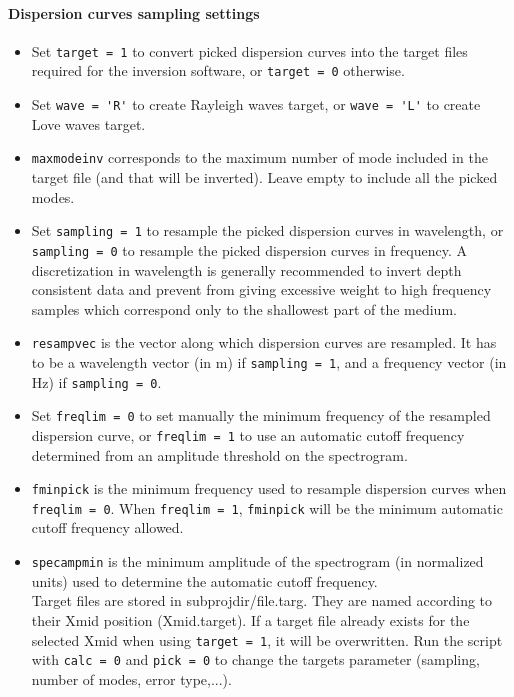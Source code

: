\documentclass[twoside,a4paper]{article}
\begin{document}
\paragraph{Dispersion curves sampling settings}
\begin{itemize}
\setlength\itemsep{2ex}
\setlength{\parindent}{5ex}

\item Set \verb|target = 1| to convert picked dispersion curves into the target files required for the inversion software, or \verb|target = 0| otherwise.

\item Set \verb|wave = 'R'| to create Rayleigh waves target, or \verb|wave = 'L'| to create Love waves target.

\item \verb|maxmodeinv| corresponds to the maximum number of mode included in the target file (and that will be inverted). Leave empty to include all the picked modes.

\item Set \verb|sampling = 1| to resample the picked dispersion curves in wavelength, or \verb|sampling = 0| to resample the picked dispersion curves in frequency. A discretization in wavelength is generally recommended to invert depth consistent data and prevent from giving excessive weight to high frequency samples which correspond only to the shallowest part of the medium.

\item \verb|resampvec| is the vector along which dispersion curves are resampled. It has to be a wavelength vector (in m) if \verb|sampling = 1|, and a frequency vector (in Hz) if \verb|sampling = 0|.

\item Set \verb|freqlim = 0| to set manually the minimum frequency of the resampled dispersion curve, or \verb|freqlim = 1| to use an automatic cutoff frequency determined from an amplitude threshold on the spectrogram.

\item \verb|fminpick| is the minimum frequency used to resample dispersion curves when \verb|freqlim = 0|. When \verb|freqlim = 1|, \verb|fminpick| will be the minimum automatic cutoff frequency allowed.

\item \verb|specampmin| is the minimum amplitude of the spectrogram (in normalized units) used to determine the automatic cutoff frequency.\\[2ex]
%
Target files are stored in subprojdir/file.targ. They are named according to their Xmid position (Xmid.target). If a target file already exists for the selected Xmid when using \verb|target = 1|, it will be overwritten. Run the script with \verb|calc = 0| and \verb|pick = 0| to change the targets parameter (sampling, number of modes, error type,...).

\end{itemize}
\end{document}
